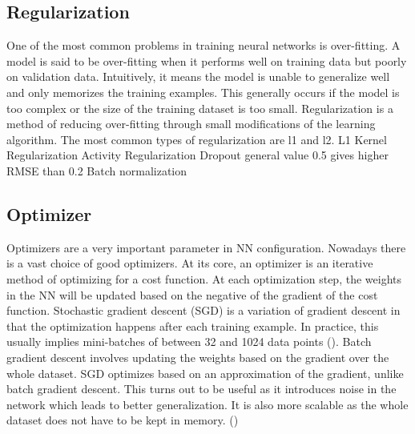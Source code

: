 

\begin{figure}[h!]
    \hfill
\end{figure}


\subsection{Regularization}
One of the most common problems in training neural networks is over-fitting. A model is said to be over-fitting when it performs well on training data but poorly on validation data. Intuitively, it means the model is unable to generalize well and only memorizes the training examples.
This generally occurs if the model is too complex or the size of the training dataset is too small.
Regularization is a method of reducing over-fitting through small modifications of the learning algorithm. The most common types of regularization are l1 and l2. L1 
Kernel Regularization
Activity Regularization
Dropout general value 0.5 gives higher RMSE than 0.2
Batch normalization

\subsection{Optimizer}
Optimizers are a very important parameter in NN configuration. Nowadays there is a vast choice of good optimizers. At its core, an optimizer is an iterative method of optimizing for a cost function. At each optimization step, the weights in the NN will be updated based on the negative of the gradient of the cost function. Stochastic gradient descent (SGD) is a variation of gradient descent in that the optimization happens after each training example. In practice, this usually implies mini-batches of between 32 and 1024 data points (\citet{practical_training}). Batch gradient descent involves updating the weights based on the gradient over the whole dataset. SGD optimizes based on an approximation of the gradient, unlike batch gradient descent. This turns out to be useful as it introduces noise in the network which leads to better generalization. It is also more scalable as the whole dataset does not have to be kept in memory. (\citet{practical_training})

